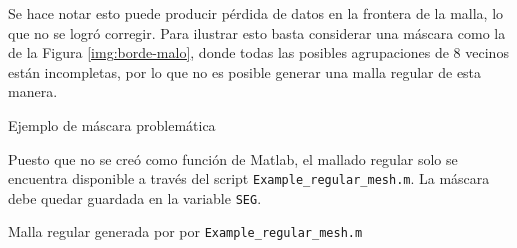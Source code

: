 
Se hace notar esto puede producir pérdida de datos en la frontera de la malla, lo que no se logró corregir. Para ilustrar esto basta considerar una máscara como la de la Figura \ref{img:borde-malo}, donde todas las posibles agrupaciones de 8 vecinos están incompletas, por lo que no es posible generar una malla regular de esta manera.

\begin{images}[\label{img:borde-malo}]{Ejemplo de máscara problemática}
\end{images}


Puesto que no se creó como función de Matlab, el mallado regular solo se encuentra disponible a través del script \texttt{Example\_regular\_mesh.m}. La máscara debe quedar guardada en la variable \texttt{SEG}.


\begin{images}[\label{img:regular}]{Malla regular generada por por \texttt{Example\_regular\_mesh.m}}
\end{images}
